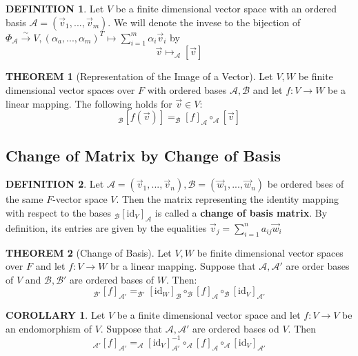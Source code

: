 \documentclass[12pt]{article}
\theoremstyle{definition}
\newtheorem{definition}{DEFINITION}[subsection]
\newtheorem{theorem}{THEOREM}[subsection]
\newtheorem{corollary}{COROLLARY}[subsection]
\begin{document}
\begin{definition}
    Let $V$ be a finite dimensional vector space with an ordered basis $\mathcal{A} = (\vec{v}_1,...,\vec{v}_m)$. We will denote the invese to the bijection of $\Phi_\mathcal{A} \stackrel{\sim}{\rightarrow} V,(\alpha_a,...,\alpha_m)^T \mapsto \sum_{i=1}^m{\alpha_i\vec{v}_i}$ by
    $$\vec{v} \mapsto _\mathcal{A}[\vec{v}]$$
\end{definition}

\begin{theorem}[Representation of the Image of a Vector]
    Let $V,W$ be finite dimensional vector spaces over $F$ with ordered bases $\mathcal{A,B}$ and let $f:V\rightarrow W$ be a linear mapping. The following holds for $\vec{v} \in V$:
    $$_\mathcal{B}[f(\vec{v})] = _\mathcal{B}[f]_\mathcal{A} \circ _\mathcal{A}[\vec{v}]$$
\end{theorem}

\subsection{Change of Matrix by Change of Basis}
\begin{definition}
    Let $\mathcal{A} = (\vec{v}_1,...,\vec{v}_n), \mathcal{B} = (\vec{w}_1,...,\vec{w}_n)$ be ordered bses of the same $F$-vector space $V$. Then the matrix representing the identity mapping with respect to the bases $_\mathcal{B}[\text{id}_V]_\mathcal{A}$ is called a \textbf{change of basis matrix}. By definition, its entries are given by the equalities $\vec{v}_j = \sum_{i=1}^n{a_{ij}\vec{w}_i}$
\end{definition}

\begin{theorem}[Change of Basis]
    Let $V,W$ be finite dimensional vector spaces over $F$ and let $f:V \rightarrow W$ br a linear mapping. Suppose that $\mathcal{A,A'}$ are order bases of $V$ and $\mathcal{B,B'}$ are ordered bases of $W$. Then:
    $$_\mathcal{B'}[f]_\mathcal{A'} = _\mathcal{B'}[\text{id}_W]_\mathcal{B} \circ _\mathcal{B}[f]_\mathcal{A} \circ _\mathcal{B}[\text{id}_V]_\mathcal{A'}$$
\end{theorem}

\begin{corollary}
    Let $V$ be a finite dimensional vector space and let $f:V\rightarrow V$ be an endomorphism of $V$. Suppose that $\mathcal{A,A'}$ are ordered bases od $V$. Then 
    $$_\mathcal{A'}[f]_\mathcal{A'} = _\mathcal{A}[\text{id}_V]_\mathcal{A'}^{-1} \circ _\mathcal{A}[f]_\mathcal{A} \circ _\mathcal{A}[\text{id}_V]_\mathcal{A'}$$
\end{corollary}
\end{document}

